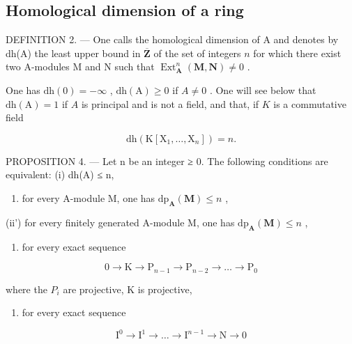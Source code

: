 \subsection{Homological dimension of a ring}

DEFINITION 2. --- One calls the homological dimension of A and denotes by dh(A) the least upper bound in \(\overline{\mathbf{Z}}\) of the set of integers \(n\) for which there exist two A-modules M and N such that \(\operatorname{Ext}_{\mathbf{A}}^{n}(\mathbf{M},\mathbf{N})\neq0\) .

One has \(\mathrm{dh}(0) = -\infty\) , \(\mathrm{dh(A)} \geqslant 0\) if \(A \neq 0\) . One will see below that \(\mathrm{dh(A)} = 1\) if \(A\) is principal and is not a field, and that, if \(K\) is a commutative field

\[
\mathrm{dh} (\mathrm{K} [ \mathrm{X} _ {1}, \dots , \mathrm{X} _ {n} ]) = n.
\]

PROPOSITION 4. --- Let n be an integer ≥ 0. The following conditions are equivalent: (i) dh(A) ≤ n,

\begin{enumerate}
\def\labelenumi{(\roman{enumi})}
\setcounter{enumi}{1}
\tightlist
\item
  for every A-module M, one has \(\mathrm{dp}_{\mathbf{A}}(\mathbf{M}) \leqslant n\) ,
\end{enumerate}

(ii') for every finitely generated A-module M, one has \(\mathrm{dp}_{\mathbf{A}}(\mathbf{M}) \leqslant n\) ,

\begin{enumerate}
\def\labelenumi{(\roman{enumi})}
\setcounter{enumi}{2}
\tightlist
\item
  for every exact sequence
\end{enumerate}

\[
0 \rightarrow \mathrm{K} \rightarrow \mathrm{P} _ {n - 1} \rightarrow \mathrm{P} _ {n - 2} \rightarrow \dots \rightarrow \mathrm{P} _ {0}
\]

where the \(P_{i}\) are projective, K is projective,

\begin{enumerate}
\def\labelenumi{(\roman{enumi})}
\setcounter{enumi}{3}
\tightlist
\item
  for every exact sequence
\end{enumerate}

\[
\mathrm{I} ^ {0} \rightarrow \mathrm{I} ^ {1} \rightarrow \dots \rightarrow \mathrm{I} ^ {n - 1} \rightarrow \mathrm{N} \rightarrow 0
\]

